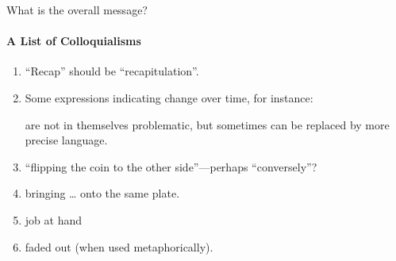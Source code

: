 \begin{scope}
What is the overall message?

\paragraph{A List of Colloquialisms}
\begin{enumerate}
\item
  ``Recap'' should be ``recapitulation''.
\item
  Some expressions indicating change over time, for instance:
  are not in themselves problematic, but sometimes can be replaced by
  more precise language.
\item
  ``flipping the coin to the other side''---perhaps ``conversely''?
\item 
  bringing \dots{} onto the same plate.
\item
  job at hand
\item
  faded out (when used metaphorically).
\end{enumerate}

\end{scope}

